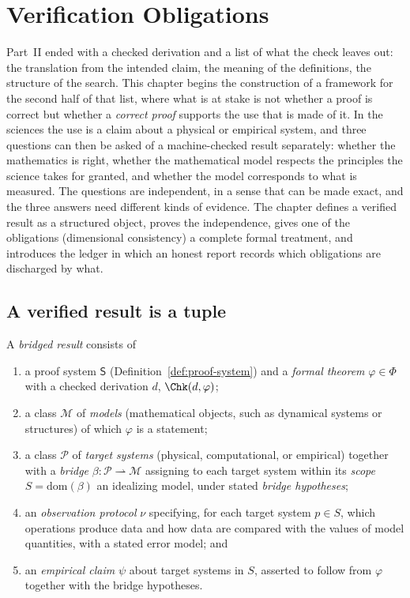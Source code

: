 \chapter{Verification Obligations}
\label{ch:obligations}

Part~II ended with a checked derivation and a list of what the check leaves out: the translation from the intended claim, the meaning of the definitions, the structure of the search. This chapter begins the construction of a framework for the second half of that list, where what is at stake is not whether a proof is correct but whether a \emph{correct proof} supports the use that is made of it. In the sciences the use is a claim about a physical or empirical system, and three questions can then be asked of a machine-checked result separately: whether the mathematics is right, whether the mathematical model respects the principles the science takes for granted, and whether the model corresponds to what is measured. The questions are independent, in a sense that can be made exact, and the three answers need different kinds of evidence. The chapter defines a verified result as a structured object, proves the independence, gives one of the obligations (dimensional consistency) a complete formal treatment, and introduces the ledger in which an honest report records which obligations are discharged by what.

\section{A verified result is a tuple}
\label{sec:tuple}

\begin{definition}
\label{def:bridged}
A \emph{bridged result} consists of
\begin{enumerate}[label=(\roman*),nosep]
\item a proof system $\mathsf{S}$ (Definition~\ref{def:proof-system}) and a \emph{formal theorem} $\varphi\in\Phi$ with a checked derivation $d$, $\Chk(d,\varphi)$;
\item a class $\mathcal{M}$ of \emph{models} (mathematical objects, such as dynamical systems or structures) of which $\varphi$ is a statement;
\item a class $\mathcal{P}$ of \emph{target systems} (physical, computational, or empirical) together with a \emph{bridge} $\beta:\mathcal{P}\rightharpoonup\mathcal{M}$ assigning to each target system within its \emph{scope} $S=\mathrm{dom}(\beta)$ an idealizing model, under stated \emph{bridge hypotheses};
\item an \emph{observation protocol} $\nu$ specifying, for each target system $p\in S$, which operations produce data and how data are compared with the values of model quantities, with a stated error model; and
\item an \emph{empirical claim} $\psi$ about target systems in $S$, asserted to follow from $\varphi$ together with the bridge hypotheses.
\end{enumerate}
\end{definition}

